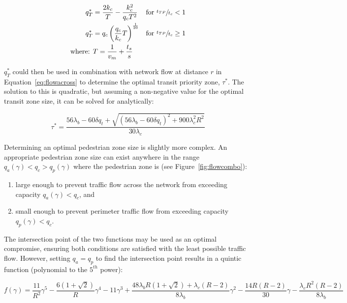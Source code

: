 \documentclass{article}
\begin{document}
\begin{subequations}
\begin{align}
    q^*_T & = \frac{2k_{c}}{T} - \frac{k_{c}^{2}}{q_{c}T^{2}} & \text{for}~ \sfrac{t_{TP}}{t_c} < 1 \\
    q^*_T & = q_{c}\left(\frac{q_{c}}{k_{c}}T\right)^{\frac{1}{20}} & \text{for}~ \sfrac{t_{TP}}{t_c} \geq 1 \\
    \text{where: } & T = \frac{1}{v_{m}} + \frac{t_{s}}{s} \notag
    \end{align}
\end{subequations}

\noindent 


$q^*_T$ could then be used in combination with network flow at distance $r$ in Equation~\eqref{eq:flowacross} to determine the optimal transit priority zone, $\tau^*$. The solution to this is quadratic, but assuming a non-negative value for the optimal transit zone size, it can be solved for analytically:

\begin{equation}
    \tau^* = \frac{56\lambda_{b}-60\delta q_{t} +\sqrt{\left(56\lambda_{b}-60\delta q_{t}\right)^{2}+900\lambda_{c}^{2}R^{2}}}{30\lambda_{c}}
\end{equation}

Determining an optimal pedestrian zone size is slightly more complex. An appropriate pedestrian zone size can exist anywhere in the range $q_a(\gamma) < q_c > q_p(\gamma)$ where the pedestrian zone is (see Figure~\ref{fig:flowcombo}):

\begin{enumerate}[label=(\alph*)]
    \item large enough to prevent traffic flow across the network from exceeding capacity $q_a(\gamma) < q_c$, and 
    \item small enough to prevent perimeter traffic flow from exceeding capacity $q_p(\gamma) < q_c$. 
\end{enumerate}

The intersection point of the two functions may be used as an optimal compromise, ensuring both conditions are satisfied with the least possible traffic flow. However, setting $q_a = q_p$ to find the intersection point results in a quintic function (polynomial to the $5^{th}$ power):

\begin{equation}
f(\gamma) = \frac{11}{R^{2}}\gamma^{5}-\frac{6(1+\sqrt{2})}{R}\gamma^{4}-11\gamma^{3}+\frac{48\lambda_{b}R(1+\sqrt{2})+\lambda_{c}(R-2)}{8\lambda_{b}}\gamma^{2}-\frac{14R(R-2)}{30}\gamma-\frac{\lambda_{c}R^{2}(R-2)}{8\lambda_{b}}
\end{equation}
\end{document}
